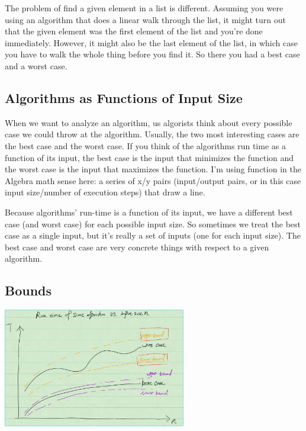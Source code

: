 \documentclass[en,hazy,blue,screen,14pt]{elegantnote}
\begin{document}
The problem of \textquotedbl find a given element in a list\textquotedbl{}
is different. Assuming you were using an algorithm that does a linear
walk through the list, it might turn out that the given element was
the first element of the list and you're done immediately. However,
it might also be the last element of the list, in which case you have
to walk the whole thing before you find it. So there you had a best
case and a worst case.

\subsection{Algorithms as Functions of Input Size}

When we want to analyze an algorithm, us algorists think about every
possible case we could throw at the algorithm. Usually, the two most
interesting cases are the best case and the worst case. If you think
of the algorithms run time as a function of its input, the best case
is the input that minimizes the function and the worst case is the
input that maximizes the function. I'm using \textquotedbl function\textquotedbl{}
in the Algebra math sense here: a series of x/y pairs (input/output
pairs, or in this case \textquotedbl input size/number of execution
steps\textquotedbl ) that draw a line.

Because algorithms' run-time is a function of its input, we have a
different best case (and worst case) for each possible input size.
So sometimes we treat the best case as a single input, but it's really
a set of inputs (one for each input size). The best case and worst
case are very concrete things with respect to a given algorithm.

\subsection{Bounds }

\centerline{\includegraphics[width=0.6\textwidth]{bounds.png}}
\end{document}
